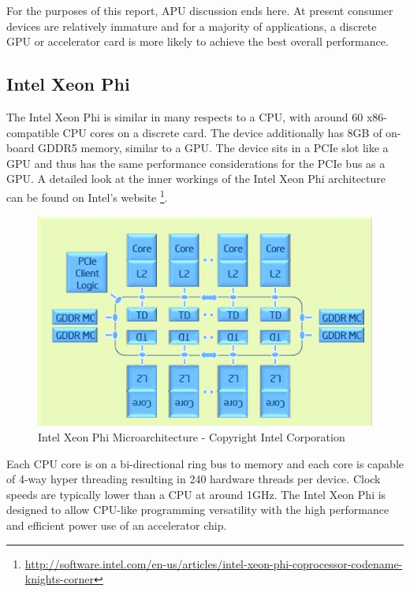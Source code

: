 For the purposes of this report, APU discussion ends here. At present consumer
devices are relatively immature and for a majority of applications, a discrete
GPU or accelerator card is more likely to achieve the best overall performance.

\subsection{Intel Xeon Phi}

The Intel Xeon Phi is similar in many respects to a CPU, with around 60
x86-compatible CPU cores on a discrete card. The device additionally has 8GB of
on-board GDDR5 memory, similar to a GPU. The device sits in a PCIe slot like a
GPU and thus has the same performance considerations for the PCIe bus as a GPU.
A detailed look at the inner workings of the Intel Xeon Phi architecture can be
found on Intel's website
\footnote{\url{http://software.intel.com/en-us/articles/intel-xeon-phi-coprocessor-codename-knights-corner}}.

\begin{figure}[H]
\centering
\includegraphics{images/intelXeonPhiMicroarchitecture.jpg}
\caption{Intel Xeon Phi Microarchitecture - Copyright Intel Corporation \textcopyright}
\label{fig:phiMicroarchitecture}
\end{figure}

Each CPU core is on a bi-directional ring bus to memory and each core is capable
of 4-way hyper threading resulting in 240 hardware threads per device. Clock
speeds are typically lower than a CPU at around 1GHz. The Intel Xeon Phi is
designed to allow CPU-like programming versatility with the high performance and
efficient power use of an accelerator chip.

